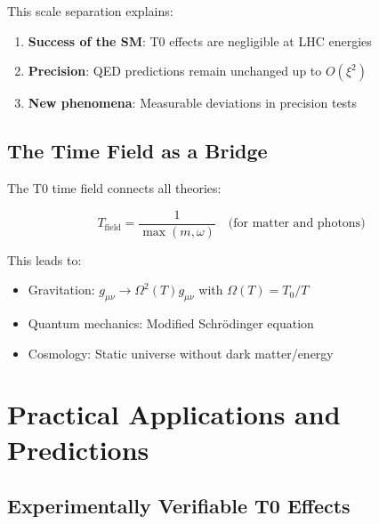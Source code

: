 	This scale separation explains:
	\begin{enumerate}
		\item \textbf{Success of the SM}: T0 effects are negligible at LHC energies
		\item \textbf{Precision}: QED predictions remain unchanged up to $O(\xi^2)$
		\item \textbf{New phenomena}: Measurable deviations in precision tests
	\end{enumerate}
	
	\subsection{The Time Field as a Bridge}
	
	The T0 time field connects all theories:
	
	\begin{equation}
		T_{\text{field}} = \frac{1}{\max(m, \omega)} \quad \text{(for matter and photons)}
	\end{equation}
	
	This leads to:
	\begin{itemize}
		\item Gravitation: $g_{\mu\nu} \to \Omega^2(T) g_{\mu\nu}$ with $\Omega(T) = T_0/T$
		\item Quantum mechanics: Modified Schrödinger equation
		\item Cosmology: Static universe without dark matter/energy
	\end{itemize}
	
	\section{Practical Applications and Predictions}
	
	\subsection{Experimentally Verifiable T0 Effects}
	
	\begin{table}[h]
		\centering
		\caption{T0 Predictions vs. Standard Model}
	\end{table}
	

